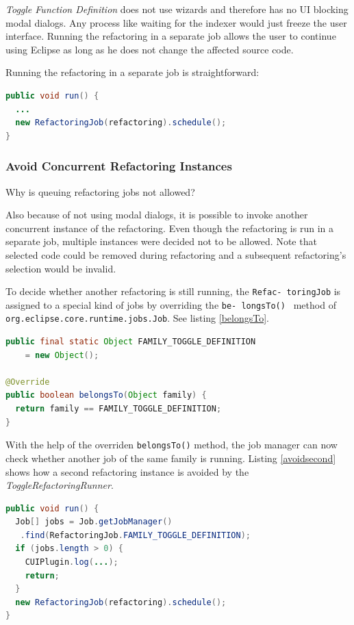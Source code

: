 \textit{Toggle Function Definition} does not use wizards and therefore 
has no UI blocking modal dialogs. Any process like waiting for the indexer would 
just freeze the user interface. Running the refactoring in a separate job 
allows the user to continue using Eclipse as long as he does not change the 
affected source code.

Running the refactoring in a separate job is straightforward:
\begin{lstlisting}[caption={ToggleRefactoringRunner starting the job},
label={jobstart}, language=Java]
public void run() {
  ...
  new RefactoringJob(refactoring).schedule();
}
\end{lstlisting}

\subsubsection{Avoid Concurrent Refactoring Instances}
Why is queuing refactoring jobs not allowed?

Also because of not using modal dialogs, it is possible to invoke another 
concurrent instance of the refactoring. Even though the refactoring is run 
in a separate job, multiple instances were decided not to be allowed. Note 
that selected code could be removed during refactoring and a subsequent 
refactoring's selection would be invalid.

To decide whether another refactoring is still running, the \texttt{Refac- 
toringJob} is assigned to a special kind of jobs by overriding the \texttt{be- 
longsTo() } method of \texttt{org.eclipse.core.runtime.jobs.Job}. See listing 
\ref{belongsTo}.

\begin{lstlisting}[caption={RefactoringJob is assigned to a separate family of 
jobs},label={belongsTo},language=java]
public final static Object FAMILY_TOGGLE_DEFINITION
    = new Object();

@Override
public boolean belongsTo(Object family) {
  return family == FAMILY_TOGGLE_DEFINITION;
}
\end{lstlisting}

With the help of the overriden \texttt{belongsTo()} method, the job manager can 
now check whether another job of the same family is running. Listing 
\ref{avoidsecond} shows how a second refactoring instance is avoided by the 
\textit{ToggleRefactoringRunner}.

\begin{lstlisting}[caption={ToggleRefactoringRunner avoiding a 2$^{nd}$ refactoring instance},
label={avoidsecond}, language=Java]
public void run() {
  Job[] jobs = Job.getJobManager()
   .find(RefactoringJob.FAMILY_TOGGLE_DEFINITION);
  if (jobs.length > 0) {
    CUIPlugin.log(...);
    return;
  }
  new RefactoringJob(refactoring).schedule();
}
\end{lstlisting}


